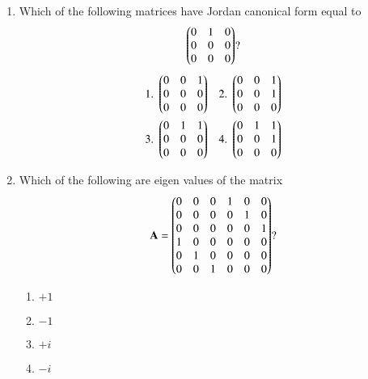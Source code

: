 \renewcommand{\theequation}{\theenumi}
\renewcommand{\thefigure}{\theenumi}
\begin{enumerate}[label=\thesection.\arabic*.,ref=\thesection.\theenumi]

\item Which of the following matrices have Jordan canonical form equal to
\begin{align*}
        \begin{pmatrix}0&1&0\\0&0&0\\0&0&0\end{pmatrix}?
\end{align*}
\begin{align*}
    \mbox{1. }\begin{pmatrix}0&0&1\\0&0&0\\0&0&0\end{pmatrix}&&\mbox{2. }\begin{pmatrix}0&0&1\\0&0&1\\0&0&0\end{pmatrix}\\
    \mbox{3. }\begin{pmatrix}0&1&1\\0&0&0\\0&0&0\end{pmatrix}&&\mbox{4. }\begin{pmatrix}0&1&1\\0&0&1\\0&0&0\end{pmatrix}
\end{align*}
%
\solution

\item Which of the following are eigen values of the matrix
\begin{align}
    \mathbf A
=\begin{pmatrix}0 &0 &0 &1 &0 &0\\0 &0 &0 &0 & 1 &0
\\ 0& 0&0 &0 &0 &1\\1& 0 &0 &0 &0 &0\\ 0& 1 &0 &0 &0 &0\\0 &0 &1 &0 &0 &0\end{pmatrix}?
\label{eq:solutions/2014/dec/86/eq:matrix}  
\end{align}
\begin{enumerate}
    \item $+1$
    \item $-1$
    \item $+i$
    \item $-i$ 
\end{enumerate}
%
\solution


\end{enumerate}

